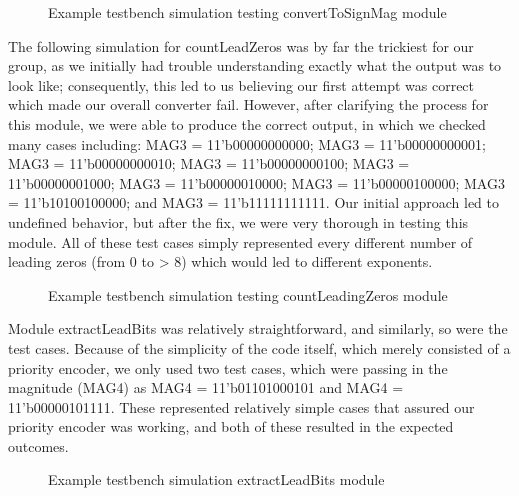 \documentclass{article}
\begin{document}
\begin{figure}[H]
	\begin{center}
		\caption{Example testbench simulation testing convertToSignMag module}
	\end{center}
\end{figure}

The following simulation for countLeadZeros was by far the trickiest for our group, as we initially had trouble understanding exactly what the output was to look like; consequently, this led to us believing our first attempt was correct which made our overall converter fail.  However, after clarifying the process for this module, we were able to produce the correct output, in which we checked many cases including: MAG3 = 11'b00000000000; MAG3 = 11'b00000000001; MAG3 = 11'b00000000010; MAG3 = 11'b00000000100; MAG3 = 11'b00000001000; MAG3 = 11'b00000010000; MAG3 = 11'b00000100000; MAG3 = 11'b10100100000; and MAG3 = 11'b11111111111.  Our initial approach led to undefined behavior, but after the fix, we were very thorough in testing this module.  All of these test cases simply represented every different number of leading zeros (from 0 to > 8) which would led to different exponents.

\begin{figure}[H]
	\begin{center}
		\caption{Example testbench simulation testing countLeadingZeros module}
	\end{center}
\end{figure}

Module extractLeadBits was relatively straightforward, and similarly, so were the test cases.  Because of the simplicity of the code itself, which merely consisted of a priority encoder, we only used two test cases, which were passing in the magnitude (MAG4) as MAG4 = 11'b01101000101 and MAG4 = 11'b00000101111.  These represented relatively simple cases that assured our priority encoder was working, and both of these resulted in the expected outcomes.


\begin{figure}[H]
	\begin{center}
		\caption{Example testbench simulation extractLeadBits module}
	\end{center}
\end{figure}
\end{document}
